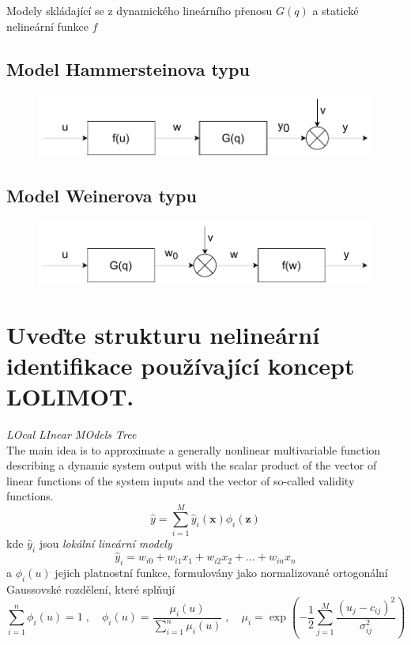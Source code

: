 \documentclass{article}
\begin{document}
	Modely skládající se z dynamického lineárního přenosu $G(q)$ a statické nelineární funkce $f$
	
	\subsection*{Model Hammersteinova typu}	
	\begin{figure}[h!]
		\centering
		\includegraphics[width=.6\linewidth]{figs/HammersteinuvModel.pdf}
	\end{figure}
	
	\subsection*{Model Weinerova typu}	
	\begin{figure}[h!]
		\centering
		\includegraphics[width=.6\linewidth]{figs/WeineruvModel.pdf}
	\end{figure}

	\section{Uveďte strukturu nelineární identifikace používající koncept LOLIMOT. } \label{lolimot}
	\emph{LOcal LInear MOdels Tree} \\
	The main idea is to approximate
	a generally nonlinear multivariable function describing
	a dynamic system output with the scalar product of
	the vector of linear functions of the system inputs and the vector of so-called validity functions.
	\begin{equation}
		\hat{y} = \sum_{i=1}^M \hat{y}_i(\bm{x}) \phi_i(\bm{z	})
	\end{equation}
	kde $\hat{y}_i$ jsou \emph{lokální lineární modely}
	\begin{equation}
		\hat{y}_i = w_{i0} + w_{i1} x_1 + w_{i2} x_2 + \dots + w_{in}x_n
	\end{equation}
	a $\phi_i(u)$ jejich platnostní funkce, formulovány jako normalizované ortogonální Gaussovské rozdělení, které splňují
	\begin{equation}
		\sum_{i=1}^n \phi_i(u) = 1
		\;,\quad 
		\phi_i(u) = \frac{\mu_i(u)}{\sum_{i=1}^n \mu_i(u)}
		\;,\quad 
		\mu_i = \exp\left(-\frac{1}{2}\sum_{j=1}^{M}\frac{(u_j-c_{ij})^2}{\sigma_{ij}^2}\right)
	\end{equation}
\end{document}
